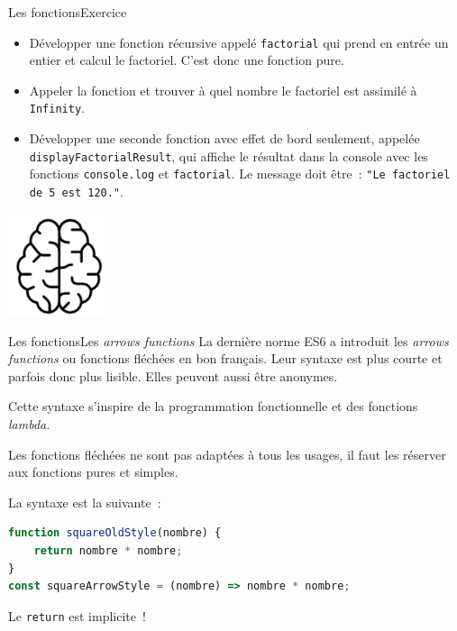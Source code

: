 \documentclass{beamer}
\begin{document}
    \begin{frame}{Les fonctions}{Exercice \execcounterdispinc{}}
        \begin{itemize}
            \item Développer une fonction récursive appelé \lstinline{factorial} qui prend en entrée un entier et calcul le factoriel.
            C'est donc une fonction pure.
            \item Appeler la fonction et trouver à quel nombre le factoriel est assimilé à \lstinline{Infinity}.
            \item Développer une seconde fonction avec effet de bord seulement, appelée \lstinline{displayFactorialResult}, qui affiche le résultat dans la console avec les fonctions \lstinline{console.log} et \lstinline{factorial}.
            Le message doit être~: \lstinline{"Le factoriel de 5 est 120."}.
        \end{itemize}
        \bigbreak
        \centering
        \includegraphics[width=3cm]{image/intelligence}
    \end{frame}

    \begin{frame}[fragile]{Les fonctions}{Les \textit{arrows functions}}
        La dernière norme ES6 a introduit les \textit{arrows functions} ou fonctions fléchées en bon français.
        Leur syntaxe est plus courte et parfois donc plus lisible.
        Elles peuvent aussi être anonymes.

        Cette syntaxe s'inspire de la programmation fonctionnelle et des fonctions \textit{lambda}.
        \begin{dangercolorbox}
            Les fonctions fléchées ne sont pas adaptées à tous les usages, il faut les réserver aux fonctions pures et simples.
        \end{dangercolorbox}
        La syntaxe est la suivante~:
        \begin{lstlisting}[language=JavaScript]
function squareOldStyle(nombre) {
    return nombre * nombre;
}
const squareArrowStyle = (nombre) => nombre * nombre;
        \end{lstlisting}
        \begin{dangercolorbox}
            Le \lstinline{return} est implicite~!
        \end{dangercolorbox}
    \end{frame}
\end{document}
